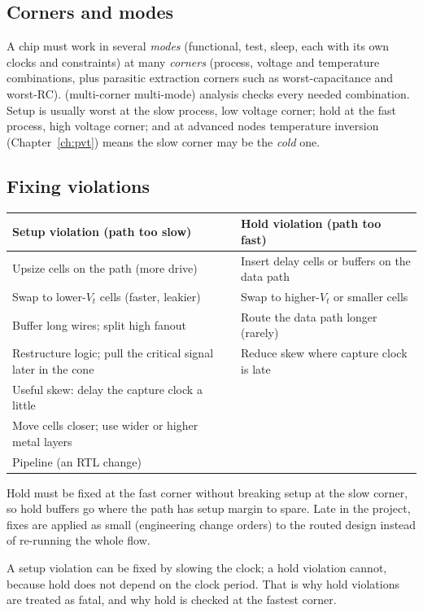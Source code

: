 \subsection*{Corners and modes}

A chip must work in several \emph{modes} (functional, test, sleep, each with its own clocks and constraints) at many \emph{corners} (process, voltage and temperature combinations, plus parasitic extraction corners such as worst-capacitance and worst-RC).  (multi-corner multi-mode) analysis checks every needed combination. Setup is usually worst at the slow process, low voltage corner; hold at the fast process, high voltage corner; and at advanced nodes temperature inversion (Chapter~\ref{ch:pvt}) means the slow corner may be the \emph{cold} one.

\subsection*{Fixing violations}

\begin{center}
\begin{tabular}{ll}
\toprule
Setup violation (path too slow) & Hold violation (path too fast) \\
\midrule
Upsize cells on the path (more drive) & Insert delay cells or buffers on the data path \\
Swap to lower-$V_t$ cells (faster, leakier) & Swap to higher-$V_t$ or smaller cells \\
Buffer long wires; split high fanout & Route the data path longer (rarely) \\
Restructure logic; pull the critical signal later in the cone & Reduce skew where capture clock is late \\
Useful skew: delay the capture clock a little & \\
Move cells closer; use wider or higher metal layers & \\
Pipeline (an RTL change) & \\
\bottomrule
\end{tabular}
\end{center}

Hold must be fixed at the fast corner without breaking setup at the slow corner, so hold buffers go where the path has setup margin to spare. Late in the project, fixes are applied as small  (engineering change orders) to the routed design instead of re-running the whole flow.

\begin{remember}
A setup violation can be fixed by slowing the clock; a hold violation cannot, because hold does not depend on the clock period. That is why hold violations are treated as fatal, and why hold is checked at the fastest corner.
\end{remember}

